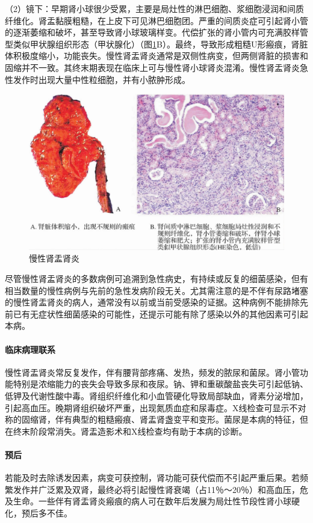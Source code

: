（2）镜下：早期肾小球很少受累，主要是局灶性的淋巴细胞、浆细胞浸润和间质纤维化。肾盂黏膜粗糙，在上皮下可见淋巴细胞团。严重的间质炎症可引起肾小管的逐渐萎缩和破坏，甚至导致肾小球玻璃样变。代偿扩张的肾小管内可充满胶样管型类似甲状腺组织形态（甲状腺化）（图\ref{fig10-27}B）。最终，导致形成粗糙U形瘢痕，肾脏体积极度缩小，功能丧失。慢性肾盂肾炎通常是双侧性病变，但两侧肾脏的损害和固缩并不一致。其终末期表现在临床上可与慢性肾小球肾炎混淆。慢性肾盂肾炎急性发作时出现大量中性粒细胞，并有小脓肿形成。

\begin{figure}[!htbp]
 \centering
 \includegraphics{./images/Image00176.jpg}
 \captionsetup{justification=centering}
 \caption{慢性肾盂肾炎}
 \label{fig10-27}
  \end{figure} 

尽管慢性肾盂肾炎的多数病例可追溯到急性病史，有持续或反复的细菌感染，但有相当数量的慢性病例与先前的急性发病阶段无关。尤其需注意的是不伴有尿路堵塞的慢性肾盂肾炎的病人，通常没有以前或当前受感染的证据。这种病例不能排除先前已有无症状性细菌感染的可能性，还提示可能有除了感染以外的其他因素可引起本病。

\paragraph{临床病理联系}
慢性肾盂肾炎常反复发作，伴有腰背部疼痛、发热，频发的脓尿和菌尿。肾小管功能特别是浓缩能力的丧失会导致多尿和夜尿。钠、钾和重碳酸盐丧失可引起低钠、低钾及代谢性酸中毒。肾组织纤维化和小血管硬化导致局部缺血，肾素分泌增加，引起高血压。晚期肾组织破坏严重，出现氮质血症和尿毒症。X线检查可显示不对称的固缩肾，伴有典型的粗糙瘢痕、肾盂肾盏变平和变形。菌尿是本病的特征，但在终末阶段常消失。肾盂造影术和X线检查均有助于本病的诊断。

\paragraph{预后}
若能及时去除诱发因素，病变可获控制，肾功能可获代偿而不引起严重后果。若频繁发作并广泛累及双肾，最终必将引起慢性肾衰竭（占11％～20％）和高血压，危及生命。一些伴有肾盂肾炎瘢痕的病人可在数年后发展为局灶性节段性肾小球硬化，预后多不佳。


